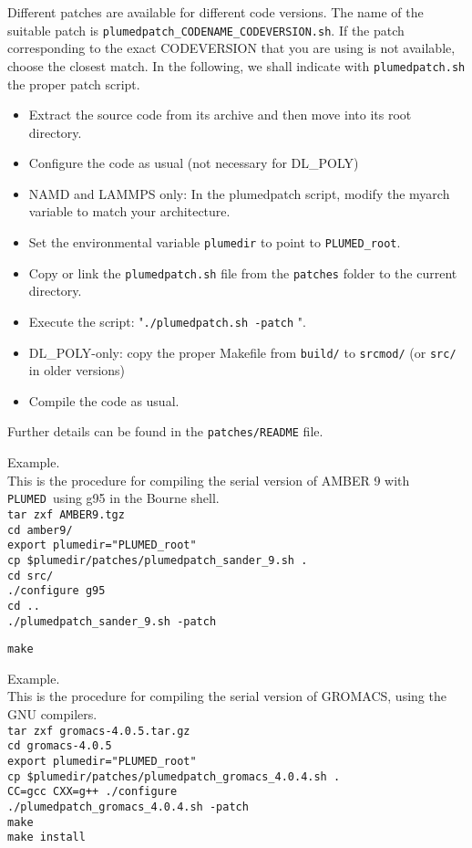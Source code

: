 \documentclass[12pt,fleqn]{report}
\newcommand{\plumed}{{\tt PLUMED}}
\newcommand{\esempio}[1]{
\vspace{10pt}
\begin{flushright}
\colorbox{light-gray}{
   \begin{minipage}{13cm}
       \scriptsize{
{\fontfamily{phv} \fontseries{b}
 \selectfont Example. \\
 \fontseries{m} \selectfont #1 } }
\end{minipage}}
\end{flushright}
\vspace{20pt}
}
\begin{document}
Different patches are available for different code versions. The name
of the suitable patch is {\tt plumedpatch\_CODENAME\_CODEVERSION.sh}.
If the patch corresponding to the exact CODEVERSION that you are using is not
available, choose the closest match.
In the following, we shall indicate with {\tt plumedpatch.sh} the proper patch script.
\begin{itemize}
\item Extract the source code from its archive and then move into its root directory.
\item Configure the code as usual (not necessary for DL\_POLY)
\item NAMD and LAMMPS only: In the plumedpatch script, modify the myarch variable to match your architecture.
\item Set the environmental variable {\tt plumedir} to point to {\tt PLUMED\_root}.
\item Copy or link the {\tt plumedpatch.sh} file from the {\tt patches} folder to the current directory.
\item Execute the script: "{\tt ./plumedpatch.sh -patch} ".
\item DL\_POLY-only: copy the proper Makefile from {\tt build/} to {\tt srcmod/} (or {\tt src/} in older versions)
\item Compile the code as usual.
\end{itemize}

Further details can be found in the {\tt patches/README} file.

\esempio{This is the procedure for compiling the serial version of AMBER 9 with \plumed \ using g95
in the Bourne shell. \vspace{10pt} \\
{\tt tar zxf AMBER9.tgz \\
cd amber9/ \\
export plumedir="PLUMED\_root" \\
cp \$plumedir/patches/plumedpatch\_sander\_9.sh . \\
cd src/ \\
./configure g95 \\
cd .. \\
./plumedpatch\_sander\_9.sh -patch \\
}

{\tt make}

}

\esempio{This is the procedure for compiling the serial version of GROMACS, using the GNU compilers. \vspace{10pt} \\
{\tt tar zxf gromacs-4.0.5.tar.gz \\
cd gromacs-4.0.5 \\
export plumedir="PLUMED\_root" \\
cp \$plumedir/patches/plumedpatch\_gromacs\_4.0.4.sh . \\
CC=gcc CXX=g++ ./configure \\
./plumedpatch\_gromacs\_4.0.4.sh -patch \\
make \\
make install
}
}
\end{document}
